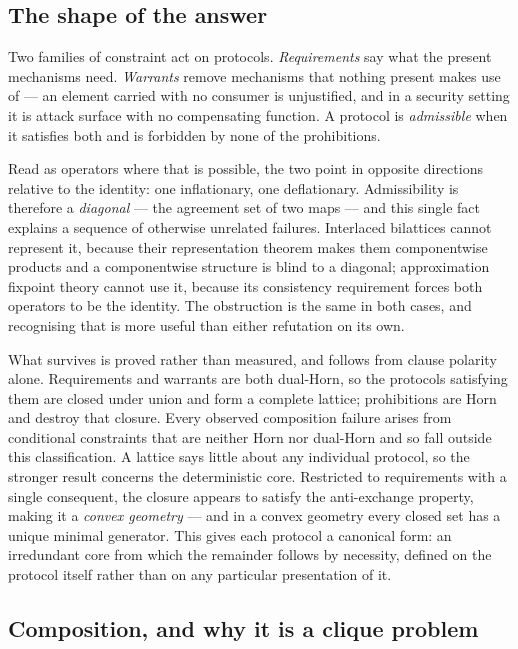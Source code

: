 \documentclass[11pt]{article}
\theoremstyle{definition}
\theoremstyle{plain}
\theoremstyle{remark}
\begin{document}
\subsection{The shape of the answer}

Two families of constraint act on protocols. \emph{Requirements} say what the
present mechanisms need. \emph{Warrants} remove mechanisms that
nothing present makes use of --- an element carried with no consumer is
unjustified, and in a security setting it is attack surface with no compensating
function. A protocol is \emph{admissible} when it satisfies both and is forbidden
by none of the prohibitions.

Read as operators where that is possible, the two point in opposite directions
relative to the identity: one inflationary, one deflationary. Admissibility is therefore a
\emph{diagonal} --- the agreement set of two maps --- and this single fact
explains a sequence of otherwise unrelated failures. Interlaced bilattices cannot represent it,
because their representation theorem makes them componentwise products and a
componentwise structure is blind to a diagonal; approximation fixpoint theory
cannot use it, because its consistency requirement forces both operators to be
the identity. The obstruction is the same in both cases, and recognising that is
more useful than either refutation on its own.

What survives is proved rather than measured, and follows from clause polarity
alone. Requirements and warrants are both dual-Horn, so the protocols satisfying
them are closed under union and form a complete lattice; prohibitions are Horn and destroy that closure. Every observed
composition failure arises from conditional constraints that are neither Horn nor
dual-Horn and so fall outside this classification. A lattice says little about any individual protocol, so the stronger result
concerns the deterministic core. Restricted to requirements with a single consequent, the
closure appears to satisfy the anti-exchange property, making it a \emph{convex
geometry} --- and in a convex geometry every closed set has a unique minimal
generator. This gives each protocol a canonical form: an irredundant core from
which the remainder follows by necessity, defined on the protocol itself rather
than on any particular presentation of it.

\subsection{Composition, and why it is a clique problem}
\end{document}

